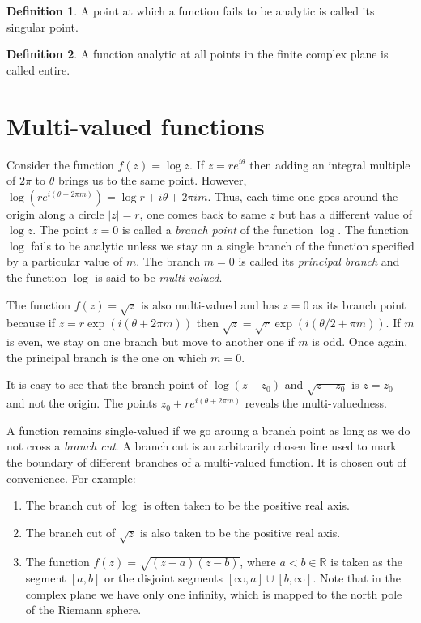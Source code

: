 \documentclass{article}
\theoremstyle{plain}
\numberwithin{thm}{section}
\theoremstyle{plain}
\numberwithin{prop}{section}
\theoremstyle{plain}
\numberwithin{prop}{section}
\theoremstyle{definition}
\newtheorem{defn}{Definition}
\numberwithin{defn}{section}
\theoremstyle{remark}
\numberwithin{equation}{section}
\begin{document}
\begin{defn}\label{s2d5}
A point at which a function fails to be analytic is called its singular point.
\end{defn}

\begin{defn}\label{s2d6}
A function analytic at all points in the finite complex plane is called entire.
\end{defn}

\section{Multi-valued functions}\label{s3}
Consider the function $f(z) = \log z$. If $z = re^{i\theta}$ then adding an
integral multiple of $2\pi$ to $\theta$ brings us to the same point. However,
$\log(re^{i(\theta + 2\pi m)}) = \log r + i\theta + 2\pi i m$. Thus, each time
one goes around the origin along a circle $|z| = r$, one comes back to same $z$
but has a different value of $\log z$. The point $z = 0$ is called a 
\emph{branch point} of the function $\log$. The function $\log$ fails to be
analytic unless we stay on a single branch of the function specified by a 
particular value of $m$. The branch $m = 0$ is called its \emph{principal
branch} and the function $\log$ is said to be \emph{multi-valued}.

The function $f(z) = \sqrt{z}$ is also multi-valued and has $z = 0$ as its
branch point because if $z = r\exp(i(\theta + 2\pi m))$ then $\sqrt{z} = 
\sqrt{r}\exp(i(\theta/2 + \pi m))$. If $m$ is even, we stay on one branch but
move to another one if $m$ is odd. Once again, the principal branch is the one
on which $m = 0$.

It is easy to see that the branch point of $\log(z - z_0)$ and $\sqrt{z - z_0}$
is $z = z_0$ and not the origin. The points $z_0 + re^{i(\theta + 2\pi m)}$
reveals the multi-valuedness.

A function remains single-valued if we go aroung a branch point as long as we
do not cross a \emph{branch cut}. A branch cut is an arbitrarily chosen line 
used to mark the boundary of different branches of a multi-valued function.
It is chosen out of convenience. For example:
\begin{enumerate}
\item The branch cut of $\log$ is often taken to be the positive real axis.
\item The branch cut of $\sqrt{z}$ is also taken to be the positive real axis.
\item The function $f(z) = \sqrt{(z - a)(z - b)}$, where $a < b \in \mathbb{R}$
is taken as the segment $[a, b]$ or the disjoint segments $[\infty, a] \cup [b,
\infty]$. Note that in the complex plane we have only one infinity, which is
mapped to the north pole of the Riemann sphere.
\end{enumerate}
\end{document}
